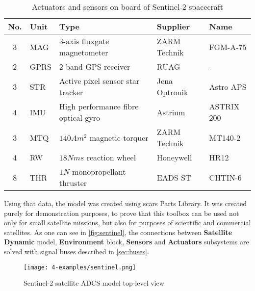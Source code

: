             
        \begin{table}    
            \small
            \begin{tabularx}{\textwidth}{ c l X l l }
                \textbf{No.} & \textbf{Uni}t & \textbf{Type} & \textbf{Supplier} & \textbf{Name} \\ \hline
                3 & MAG & 3-axis fluxgate magnetometer & ZARM Technik & FGM-A-75 \\
                2 & GPRS & 2 band GPS receiver & RUAG & - \\
                3 & STR  & Active pixel sensor star tracker & Jena Optronik & Astro APS \\
                4 & IMU & High performance fibre optical gyro & Astrium & ASTRIX 200 \\
                3 & MTQ & $140 Am^2$ magnetic torquer & ZARM Technik & MT140-2\\
                4 & RW & $18 Nms$ reaction wheel & Honeywell & HR12 \\
                8 & THR & $1N$ monopropellant thruster & EADS ST &CHTIN-6 \\ \hline
            \end{tabularx}
            \caption{Actuators and sensors on board of Sentinel-2 spacecraft\cite{sentinelreference_adcs}}\label{table:sentinel-adcs}
        \end{table}

        Using that data, the model was created using \ac{scars} Parts Library. It was created purely for demonstration purposes, to prove that this toolbox can be used not only for small satellite missions, but also for purposes of scientific and commercial satellites. As one can see in \autoref{fig:sentinel}, the connections between \textbf{Satellite Dynamic} model, \textbf{Environment} block, \textbf{Sensors} and \textbf{Actuators} subsystems are solved with signal buses described in \autoref{sec:buses}.
        
        \begin{sidewaysfigure}
            \centering
            \texttt{[image: 4-examples/sentinel.png]}
            \caption{Sentinel-2 satellite ADCS model top-level view}
            \label{fig:sentinel}
        \end{sidewaysfigure}

